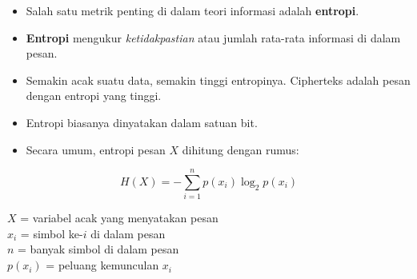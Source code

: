 \documentclass{article}
\begin{document}

\begin{itemize}
    \item Salah satu metrik penting di dalam teori informasi adalah \textbf{entropi}.
    \item \textbf{Entropi} mengukur \textit{ketidakpastian} atau jumlah rata-rata informasi di dalam pesan.
    \item Semakin acak suatu data, semakin tinggi entropinya. Cipherteks adalah pesan dengan entropi yang tinggi.
    \item Entropi biasanya dinyatakan dalam satuan bit.
    \item Secara umum, entropi pesan $X$ dihitung dengan rumus:
\end{itemize}

\vspace{5mm}

\[ H(X) = - \sum_{i=1}^{n} p(x_i) \log_2 p(x_i) \]

\vspace{5mm}

$X$ = variabel acak yang menyatakan pesan \\
$x_i$ = simbol ke-$i$ di dalam pesan \\
$n$ = banyak simbol di dalam pesan \\
$p(x_i)$ = peluang kemunculan $x_i$
\end{document}
